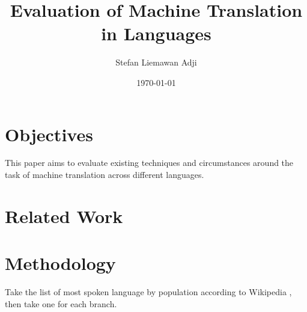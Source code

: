 \documentclass[a4paper]{article}
\title{Evaluation of Machine Translation in Languages}
\author{Stefan Liemawan Adji}
\date{\today}
\begin{document}
\maketitle

\section{Objectives}

This paper aims to evaluate existing techniques and circumstances around the task of machine translation across different languages.

\section{Related Work}

\section{Methodology}

Take the list of most spoken language by population according to Wikipedia \cite{wikipedia-list-languages}, then take one for each branch.
\end{document}
